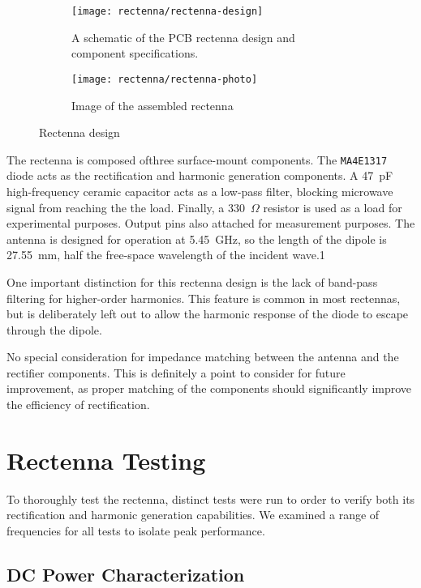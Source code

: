 \begin{figure}[h!]
    \centering
    \begin{subfigure}{.85\textwidth}
        \centering
        \texttt{[image: rectenna/rectenna-design]}
        \caption[Rectenna schematica]{A schematic of the PCB rectenna design and component specifications.}
    \end{subfigure}
    \begin{subfigure}{.85\textwidth}
        \centering
        \texttt{[image: rectenna/rectenna-photo]}
        \caption[Assembled rectenna photo]{Image of the assembled rectenna}
    \end{subfigure}
    \caption[Rectenna design]{Rectenna design}
    \label{fig:rectenna-design}
\end{figure}

The rectenna is composed ofthree surface-mount components. The \texttt{MA4E1317} diode acts as the rectification and harmonic generation components. A 47~pF high-frequency ceramic capacitor acts as a low-pass filter, blocking microwave signal from reaching the the load. Finally, a 330~$\Omega$ resistor is used as a load for experimental purposes. Output pins also attached for measurement purposes. The antenna is designed for operation at 5.45~GHz, so the length of the dipole is 27.55~mm, half the free-space wavelength of the incident wave.1

One important distinction for this rectenna design is the lack of band-pass filtering for higher-order harmonics. This feature is common in most rectennas, but is deliberately left out to allow the harmonic response of the diode to escape through the dipole.

No special consideration for impedance matching between the antenna and the rectifier components. This is definitely a point to consider for future improvement, as proper matching of the components should significantly improve the efficiency of rectification.

\section{Rectenna Testing}
\label{sec:rectenna-testing}

To thoroughly test the rectenna, distinct tests were run to order to verify both its rectification and harmonic generation capabilities. We examined a range of frequencies for all tests to isolate peak performance.

\subsection{DC Power Characterization}

